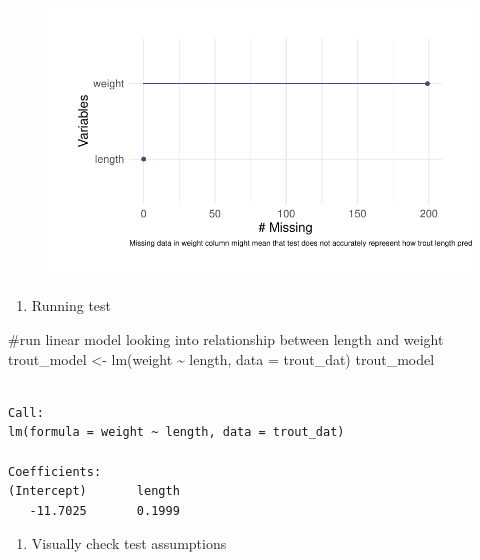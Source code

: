 \documentclass[
  letterpaper,
  DIV=11,
  numbers=noendperiod]{scrartcl}
\newenvironment{Shaded}{\begin{snugshade}}{\end{snugshade}}
\newcommand{\AttributeTok}[1]{\textcolor[rgb]{0.40,0.45,0.13}{#1}}
\newcommand{\CommentTok}[1]{\textcolor[rgb]{0.37,0.37,0.37}{#1}}
\newcommand{\FunctionTok}[1]{\textcolor[rgb]{0.28,0.35,0.67}{#1}}
\newcommand{\NormalTok}[1]{\textcolor[rgb]{0.00,0.23,0.31}{#1}}
\newcommand{\OtherTok}[1]{\textcolor[rgb]{0.00,0.23,0.31}{#1}}
\newcommand{\SpecialCharTok}[1]{\textcolor[rgb]{0.37,0.37,0.37}{#1}}
\providecommand{\tightlist}{%
  \setlength{\itemsep}{0pt}\setlength{\parskip}{0pt}}\usepackage{longtable,booktabs,array}
\begin{document}
\begin{figure}[H]

{\centering \includegraphics{ENVS-193DS-Homework-4_files/figure-pdf/unnamed-chunk-2-1.pdf}

}

\end{figure}

\begin{enumerate}
\def\labelenumi{\arabic{enumi}.}
\setcounter{enumi}{2}
\tightlist
\item
  Running test
\end{enumerate}

\begin{Shaded}
\begin{Highlighting}[]
\CommentTok{\#run linear model looking into relationship between length and weight}
\NormalTok{trout\_model }\OtherTok{\textless{}{-}} \FunctionTok{lm}\NormalTok{(weight }\SpecialCharTok{\textasciitilde{}}\NormalTok{ length, }\AttributeTok{data =}\NormalTok{ trout\_dat)}
\NormalTok{trout\_model}
\end{Highlighting}
\end{Shaded}

\begin{verbatim}

Call:
lm(formula = weight ~ length, data = trout_dat)

Coefficients:
(Intercept)       length  
   -11.7025       0.1999  
\end{verbatim}

\begin{enumerate}
\def\labelenumi{\arabic{enumi}.}
\setcounter{enumi}{3}
\tightlist
\item
  Visually check test assumptions
\end{enumerate}
\end{document}
